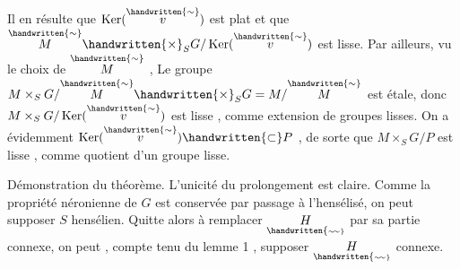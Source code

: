 Il en résulte que $\operatorname{Ker}(\overset{\handwritten{\sim}}{v})$ est plat  et que $\overset{\handwritten{\sim}}{M}\handwritten{\times}_S G/\operatorname{Ker}(\overset{\handwritten{\sim}}{v})$ est lisse. Par
ailleurs, vu le choix de $\overset{\handwritten{\sim}}{M}$ , Le groupe $M\times_S G/\overset{\handwritten{\sim}}{M}\handwritten{\times}_S G=M/\overset{\handwritten{\sim}}{M}$ est étale, donc
$M\times_S G/\operatorname{Ker}(\overset{\handwritten{\sim}}{v})$ est lisse , comme extension de groupes lisses. On a évidemment
$\operatorname{Ker}(\overset{\handwritten{\sim}}{v})\handwritten{\subset} P$ , de sorte que $M\times_S G/P$ est  lisse , comme quotient d'un groupe
lisse.

Démonstration du théorème. L'unicité du prolongement est claire. Comme la
propriété néronienne de $G$ est conservée par passage à l'hensélisé, on peut
supposer $S$ hensélien. Quitte alors à remplacer $\underset{\handwritten{\scriptscriptstyle\sim\!\sim}}{H}$ par sa partie connexe, on
peut , compte tenu du lemme 1 , supposer  $\underset{\handwritten{\scriptscriptstyle\sim\!\sim}}{H}$ connexe.

